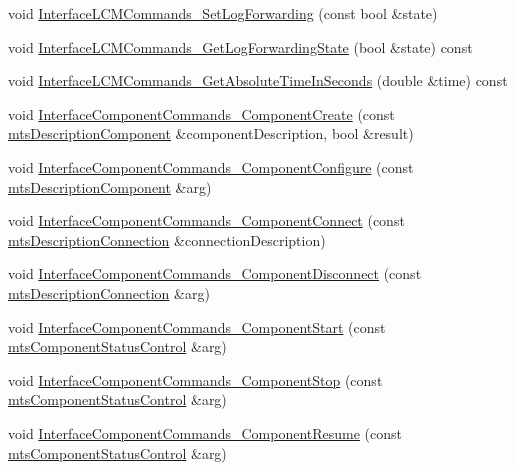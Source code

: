 \begin{DoxyCompactItemize}
\item 
void \hyperlink{classmts_manager_component_client_a4e35db3722fc57873409058c123d7ec3}{Interface\-L\-C\-M\-Commands\-\_\-\-Set\-Log\-Forwarding} (const bool \&state)
\item 
void \hyperlink{classmts_manager_component_client_a943187af07d69373d01e77dcc1c460bf}{Interface\-L\-C\-M\-Commands\-\_\-\-Get\-Log\-Forwarding\-State} (bool \&state) const 
\item 
void \hyperlink{classmts_manager_component_client_aa613964d738cdf8ddd95b2804cd7e1e2}{Interface\-L\-C\-M\-Commands\-\_\-\-Get\-Absolute\-Time\-In\-Seconds} (double \&time) const 
\item 
void \hyperlink{classmts_manager_component_client_a806767b2de84dc3f321cf94bdabdf155}{Interface\-Component\-Commands\-\_\-\-Component\-Create} (const \hyperlink{classmts_description_component}{mts\-Description\-Component} \&component\-Description, bool \&result)
\item 
void \hyperlink{classmts_manager_component_client_a01f07ac088b85aafbbafadd7e1226134}{Interface\-Component\-Commands\-\_\-\-Component\-Configure} (const \hyperlink{classmts_description_component}{mts\-Description\-Component} \&arg)
\item 
void \hyperlink{classmts_manager_component_client_a127c76c11be57fc84ff4eb7f2558248d}{Interface\-Component\-Commands\-\_\-\-Component\-Connect} (const \hyperlink{classmts_description_connection}{mts\-Description\-Connection} \&connection\-Description)
\item 
void \hyperlink{classmts_manager_component_client_adf9f69121fc903ff25375b1c788cf133}{Interface\-Component\-Commands\-\_\-\-Component\-Disconnect} (const \hyperlink{classmts_description_connection}{mts\-Description\-Connection} \&arg)
\item 
void \hyperlink{classmts_manager_component_client_a3dba91132c57038c7fab0aed721a2332}{Interface\-Component\-Commands\-\_\-\-Component\-Start} (const \hyperlink{classmts_component_status_control}{mts\-Component\-Status\-Control} \&arg)
\item 
void \hyperlink{classmts_manager_component_client_aea7d360a980850be7240946beeb308af}{Interface\-Component\-Commands\-\_\-\-Component\-Stop} (const \hyperlink{classmts_component_status_control}{mts\-Component\-Status\-Control} \&arg)
\item 
void \hyperlink{classmts_manager_component_client_ad1aba071e3395654ecb8b15ea3894296}{Interface\-Component\-Commands\-\_\-\-Component\-Resume} (const \hyperlink{classmts_component_status_control}{mts\-Component\-Status\-Control} \&arg)

\end{DoxyCompactItemize}
